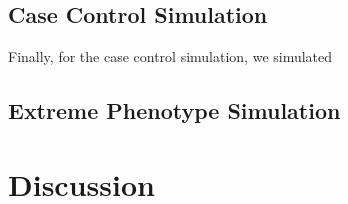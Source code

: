 		\subsection{Case Control Simulation}
		
		Finally, for the case control simulation, we simulated 
		
		\subsection{Extreme Phenotype Simulation}
		
	\section{Discussion}

	
